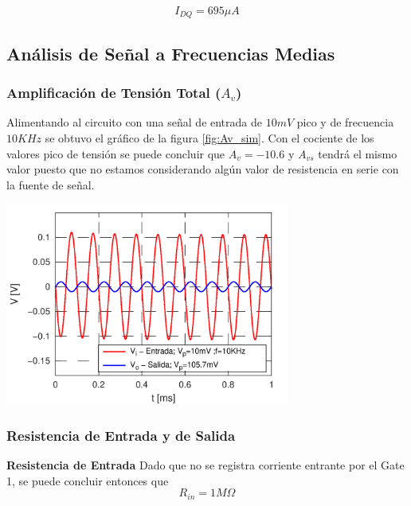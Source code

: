 \documentclass[a4paper, 10pt, spanish]{article}
\begin{document}
\begin{equation}
  I_{DQ} = 695 \mu A
\end{equation}


\subsection{Análisis de Señal a Frecuencias Medias}

\subsubsection{Amplificación de Tensión Total ($A_v$)}
Alimentando al circuito con una señal de entrada de $10mV$ pico y de frecuencia $10KHz$ se obtuvo el gráfico de la figura \ref{fig:Av_sim}. Con el cociente de los valores pico de tensión se puede concluir que $A_v=-10.6$ y $A_{vs}$ tendrá el mismo valor puesto que no estamos considerando algún valor de resistencia en serie con la fuente de señal.

\begin{center}
  \includegraphics[width=0.7\textwidth]{Av_sim.png}
  \label{fig:Av_sim}
\end{center}

\subsubsection{Resistencia de Entrada y de Salida}
\textbf{Resistencia de Entrada}
Dado que no se registra corriente entrante por el Gate 1, se puede concluir entonces que
\begin{equation}
  R_{in} = 1M\Omega
\end{equation}
\end{document}
